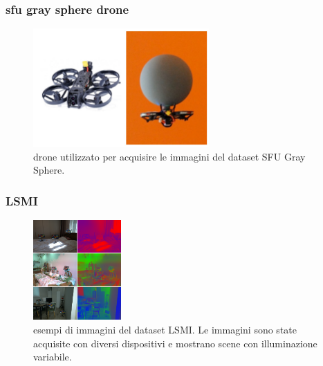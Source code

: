 \documentclass[aspectratio=169]{beamer}
\begin{document}
    \begin{frame}
      \frametitle{sfu gray sphere drone}
      \begin{figure}[h]
        \centering
        \includegraphics[width=0.6\textwidth]{img/sfu-drone.png}
        \caption{drone utilizzato per acquisire le immagini del dataset SFU Gray Sphere.}
        \label{fig:sfu-drone}
      \end{figure}
    \end{frame}

    \begin{frame}
      \frametitle{LSMI}

      \begin{figure}[h]
        \centering
        \includegraphics[width=0.3\textwidth]{img/lsmi-dataset-sample.png}
        \caption{esempi di immagini del dataset LSMI. Le immagini sono state acquisite con diversi dispositivi e mostrano scene con illuminazione variabile.}
        \label{fig:lsmi-dataset-sample}
      \end{figure}
    \end{frame}
\end{document}
